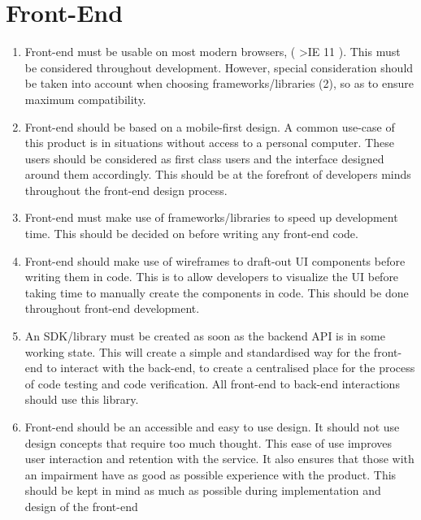 \documentclass[a4paper,11pt]{report}
\begin{document}
\section{Front-End}
\begin{enumerate}
    \item Front-end must be usable on most modern browsers, ( \textgreater IE 11 ). This
    must be considered throughout development. However, special consideration
    should be taken into account when choosing frameworks/libraries (2), so as
    to ensure maximum compatibility.

    \item Front-end should be based on a mobile-first design. A common use-case
    of this product is in situations without access to a personal computer.
    These users should be considered as first class users and the interface
    designed around them accordingly. This should be at the forefront of
    developers minds throughout the front-end design process.

    \item Front-end must make use of frameworks/libraries to speed up
    development time. This should be decided on before writing any front-end
    code.

    \item Front-end should make use of wireframes to draft-out UI components
    before writing them in code. This is to allow developers to visualize the UI
    before taking time to manually create the components in code. This should be
    done throughout front-end development.

    \item An SDK/library must be created as soon as the backend API is in some
    working state. This will create a simple and standardised way for the
    front-end to interact with the back-end, to create a centralised place for
    the process of code testing and code verification. All front-end to back-end
    interactions should use this library.

    \item Front-end should be an accessible and easy to use design. It should
    not use design concepts that require too much thought. This ease of use
    improves user interaction and retention with the service. It also ensures
    that those with an impairment have as good as possible experience with the
    product. This should be kept in mind as much as possible during
    implementation and design of the front-end
\end{enumerate}
\end{document}
